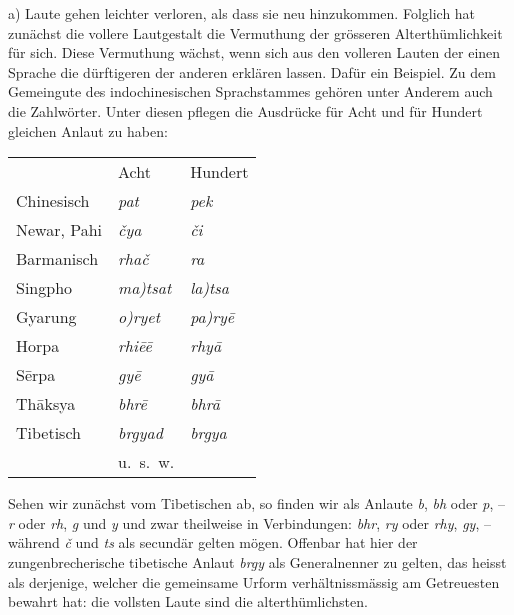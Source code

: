 \label{III.I.I.2B1a}a) Laute gehen leichter verloren, als dass sie neu hinzukommen. Folglich hat zunächst die vollere Lautgestalt die Vermuthung der grösseren Alterthümlichkeit für sich. Diese Vermuthung wächst, wenn sich aus den volleren Lauten der einen Sprache die dürftigeren der anderen erklären lassen. Dafür ein Beispiel. \label{sp.157} Zu dem Gemeingute des indochine\label{fp.167}sischen Sprachstammes gehören unter Anderem auch die Zahlwörter. Unter diesen pflegen die Ausdrücke für Acht und für Hundert gleichen Anlaut zu haben:

\begin{table}[h]
\centering
\begin{tabular}{ l l l}
 & Acht & Hundert \\
Chinesisch & \textit{pat} & \textit{pek} \\
Newar, Pahi & \textit{čya} & \textit{či} \\
Barmanisch & \textit{rhač} & \textit{ra} \\
Singpho & \textit{ma)tsat} & \textit{la)tsa} \\
Gyarung & \textit{o)ryet} & \textit{pa)ryē} \\
Horpa & \textit{rhiēē} & \textit{rhyā} \\
Sērpa & \textit{gyē} & \textit{gyā} \\
Thāksya & \textit{bhrē} & \textit{bhrā} \\
Tibetisch & \textit{brgyad} & \textit{brgya} \\
 & u.~s.~w. & \\
\end{tabular}
\end{table}

\noindent Sehen wir zunächst vom Tibetischen ab, so finden wir als Anlaute \textit{b}, \textit{bh} oder \textit{p}, – \textit{r} oder \textit{rh}, \textit{g} und \textit{y} und zwar theilweise in Verbindungen: \textit{bhr}, \textit{ry} oder \textit{rhy}, \textit{gy}, – während \textit{č} und \textit{ts} als secundär gelten mögen. Offenbar hat hier der zungenbrecherische tibetische Anlaut \textit{brgy} als Generalnenner zu gelten, das heisst als derjenige, welcher die gemeinsame Urform verhältnissmässig am Getreuesten bewahrt hat: die vollsten Laute sind die alterthümlichsten.

